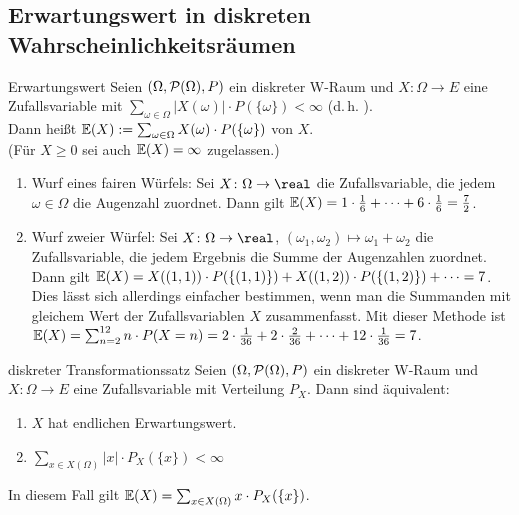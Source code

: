 \pagebreak

\subsection{%
    Erwartungswert in diskreten Wahrscheinlichkeitsräumen%
}

\begin{Def}{Erwartungswert}
    Seien $(\Omega, \P(\Omega), P)$ ein diskreter W-Raum und
    $X\colon \Omega \rightarrow E$ eine Zufallsvariable mit
    $\sum_{\omega \in \Omega} |X(\omega)| \cdot P(\{\omega\}) < \infty$
    (d.\,h. ).\\
    Dann heißt $\EW(X) := \sum_{\omega \in \Omega} X(\omega) \cdot P(\{\omega\})$
     von $X$.\\
    (Für $X \ge 0$ sei auch $\EW(X) = \infty$ zugelassen.)
\end{Def}

\begin{Bsp}
    \begin{enumerate}
        \item
        Wurf eines fairen Würfels:
        Sei $X\colon \Omega \rightarrow \real$ die Zufallsvariable, die jedem $\omega \in \Omega$
        die Augenzahl zuordnet.
        Dann gilt $\EW(X) = 1 \cdot \frac{1}{6} + \dotsb + 6 \cdot \frac{1}{6} = \frac{7}{2}$.
        
        \item
        Wurf zweier Würfel:
        Sei $X\colon \Omega \rightarrow \real$,
        $(\omega_1, \omega_2) \mapsto \omega_1 + \omega_2$ die Zufallsvariable, die jedem Ergebnis
        die Summe der Augenzahlen zuordnet.\\
        Dann gilt $\EW(X) = X((1, 1)) \cdot P(\{(1, 1)\}) +
        X((1, 2)) \cdot P(\{(1, 2)\}) + \dotsb = 7$.\\
        Dies lässt sich allerdings einfacher bestimmen, wenn man die Summanden mit gleichem
        Wert der Zufallsvariablen $X$ zusammenfasst.
        Mit dieser Methode ist\\
        $\EW(X) = \sum_{n=2}^{12} n \cdot P(X = n) =
        2 \cdot \frac{1}{36} + 2 \cdot \frac{2}{36} + \dotsb + 12 \cdot \frac{1}{36} = 7$.
    \end{enumerate}
\end{Bsp}

\begin{Satz}{diskreter Transformationssatz}
    Seien $(\Omega, \P(\Omega), P)$ ein diskreter W-Raum und
    $X\colon \Omega \rightarrow E$ eine Zufallsvariable mit Verteilung $P_X$.
    Dann sind äquivalent:
    \begin{enumerate}
        \item
        $X$ hat endlichen Erwartungswert.
        
        \item
        $\sum_{x \in X(\Omega)} |x| \cdot P_X(\{x\}) < \infty$
    \end{enumerate}
    In diesem Fall gilt $\EW(X) = \sum_{x \in X(\Omega)} x \cdot P_X(\{x\})$.
\end{Satz}

